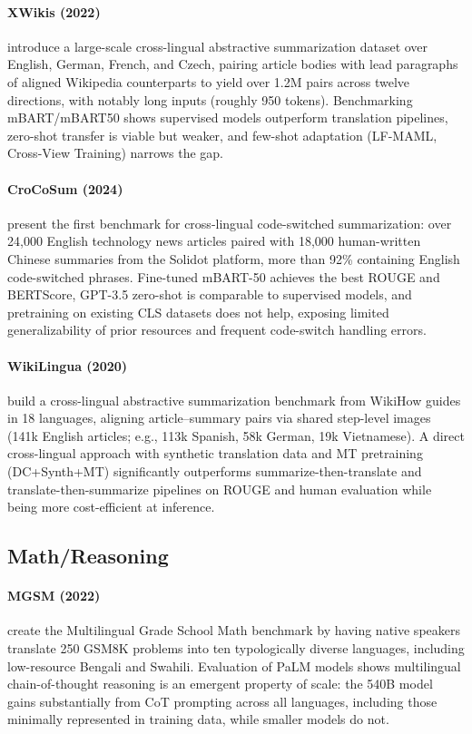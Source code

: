 \documentclass[letterpaper]{article}
\begin{document}
\paragraph{XWikis (2022)} \citet{perezbeltrachini2022modelsdatasetscrosslingualsummarisation} introduce a large-scale cross-lingual abstractive summarization dataset over English, German, French, and Czech, pairing article bodies with lead paragraphs of aligned Wikipedia counterparts to yield over 1.2M pairs across twelve directions, with notably long inputs (roughly 950 tokens). Benchmarking mBART/mBART50 shows supervised models outperform translation pipelines, zero-shot transfer is viable but weaker, and few-shot adaptation (LF-MAML, Cross-View Training) narrows the gap.

\paragraph{CroCoSum (2024)} \citet{zhang-eickhoff-2024-crocosum} present the first benchmark for cross-lingual code-switched summarization: over 24,000 English technology news articles paired with 18,000 human-written Chinese summaries from the Solidot platform, more than 92\% containing English code-switched phrases. Fine-tuned mBART-50 achieves the best ROUGE and BERTScore, GPT-3.5 zero-shot is comparable to supervised models, and pretraining on existing CLS datasets does not help, exposing limited generalizability of prior resources and frequent code-switch handling errors.

\paragraph{WikiLingua (2020)} \citet{ladhak-etal-2020-wikilingua} build a cross-lingual abstractive summarization benchmark from WikiHow guides in 18 languages, aligning article--summary pairs via shared step-level images (141k English articles; e.g., 113k Spanish, 58k German, 19k Vietnamese). A direct cross-lingual approach with synthetic translation data and MT pretraining (DC+Synth+MT) significantly outperforms summarize-then-translate and translate-then-summarize pipelines on ROUGE and human evaluation while being more cost-efficient at inference.

\subsection{Math/Reasoning}

\paragraph{MGSM (2022)} \citet{shi2022language} create the Multilingual Grade School Math benchmark by having native speakers translate 250 GSM8K problems into ten typologically diverse languages, including low-resource Bengali and Swahili. Evaluation of PaLM models shows multilingual chain-of-thought reasoning is an emergent property of scale: the 540B model gains substantially from CoT prompting across all languages, including those minimally represented in training data, while smaller models do not.
\end{document}
